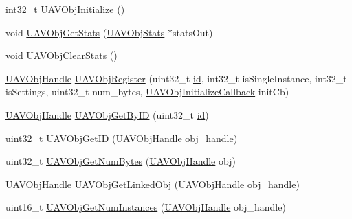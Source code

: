 \begin{DoxyCompactItemize}
\item 
int32\-\_\-t \hyperlink{group___u_a_v_object_handling_ga07599909613c0729f06c1b4b8a2296af}{\-U\-A\-V\-Obj\-Initialize} ()
\item 
void \hyperlink{group___u_a_v_object_handling_ga6ff4107796c9693e8034e7c77a26f066}{\-U\-A\-V\-Obj\-Get\-Stats} (\hyperlink{struct_u_a_v_obj_stats}{\-U\-A\-V\-Obj\-Stats} $\ast$stats\-Out)
\item 
void \hyperlink{group___u_a_v_object_handling_gae604f34af94a200b96787f24abb32ce1}{\-U\-A\-V\-Obj\-Clear\-Stats} ()
\item 
\hyperlink{targets_2_u_a_v_objects_2inc_2uavobjectmanager_8h_a279053e22be53ce9f895043aaeb91e3b}{\-U\-A\-V\-Obj\-Handle} \hyperlink{group___u_a_v_object_handling_ga88eab3d936394b3dffd65db8a148b9b1}{\-U\-A\-V\-Obj\-Register} (uint32\-\_\-t \hyperlink{uavobjectmanager_8c_abaabdc509cdaba7df9f56c6c76f3ae19}{id}, int32\-\_\-t is\-Single\-Instance, int32\-\_\-t is\-Settings, uint32\-\_\-t num\-\_\-bytes, \hyperlink{targets_2_u_a_v_objects_2inc_2uavobjectmanager_8h_a16def10911b9b7e8626c2d1e3fec6e67}{\-U\-A\-V\-Obj\-Initialize\-Callback} init\-Cb)
\item 
\hyperlink{targets_2_u_a_v_objects_2inc_2uavobjectmanager_8h_a279053e22be53ce9f895043aaeb91e3b}{\-U\-A\-V\-Obj\-Handle} \hyperlink{group___u_a_v_object_handling_ga17a9665c830f577232ad694ab4baaea6}{\-U\-A\-V\-Obj\-Get\-By\-I\-D} (uint32\-\_\-t \hyperlink{uavobjectmanager_8c_abaabdc509cdaba7df9f56c6c76f3ae19}{id})
\item 
uint32\-\_\-t \hyperlink{group___u_a_v_object_handling_ga197049afa1062802ec0dc2c7c971d89e}{\-U\-A\-V\-Obj\-Get\-I\-D} (\hyperlink{targets_2_u_a_v_objects_2inc_2uavobjectmanager_8h_a279053e22be53ce9f895043aaeb91e3b}{\-U\-A\-V\-Obj\-Handle} obj\-\_\-handle)
\item 
uint32\-\_\-t \hyperlink{group___u_a_v_object_handling_ga08b602bb9381c3c2806140ed32a5af74}{\-U\-A\-V\-Obj\-Get\-Num\-Bytes} (\hyperlink{targets_2_u_a_v_objects_2inc_2uavobjectmanager_8h_a279053e22be53ce9f895043aaeb91e3b}{\-U\-A\-V\-Obj\-Handle} obj)
\item 
\hyperlink{targets_2_u_a_v_objects_2inc_2uavobjectmanager_8h_a279053e22be53ce9f895043aaeb91e3b}{\-U\-A\-V\-Obj\-Handle} \hyperlink{group___u_a_v_object_handling_ga9b6a21cc5abcfe4af811f65a3744d4f3}{\-U\-A\-V\-Obj\-Get\-Linked\-Obj} (\hyperlink{targets_2_u_a_v_objects_2inc_2uavobjectmanager_8h_a279053e22be53ce9f895043aaeb91e3b}{\-U\-A\-V\-Obj\-Handle} obj\-\_\-handle)
\item 
uint16\-\_\-t \hyperlink{group___u_a_v_object_handling_ga264590c39739a19082e2c32d91f6e3ce}{\-U\-A\-V\-Obj\-Get\-Num\-Instances} (\hyperlink{targets_2_u_a_v_objects_2inc_2uavobjectmanager_8h_a279053e22be53ce9f895043aaeb91e3b}{\-U\-A\-V\-Obj\-Handle} obj\-\_\-handle)

\end{DoxyCompactItemize}
